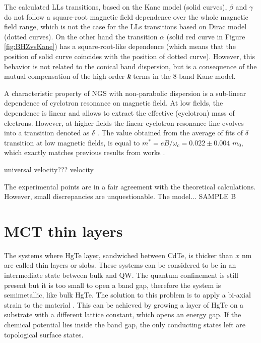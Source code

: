 \documentclass[titlepage,a4paper]{book}
\newcommand{\wciecie}{\quad\phantom{v}}
\begin{document}
The calculated LLs transitions, based on the Kane model (solid curves), $\beta$ and $\gamma$ do not follow a square-root magnetic field dependence over the whole magnetic field range, which is not the case for the LLs transitions based on Dirac model (dotted curves). On the other hand the transition $\alpha$ (solid red curve in Figure \ref{fig:BHZvsKane}) has a square-root-like dependence (which means that the position of solid curve coincides with the position of dotted curve). However, this behavior is not related to the conical band dispersion, but is a consequence of the mutual compensation of the high order \textbf{\textit{k}} terms in the 8-band Kane model.

A characteristic property of NGS with non-parabolic dispersion is a sub-linear dependence of cyclotron resonance on magnetic field. At low fields, the dependence is linear and allows to extract the effective (cyclotron) mass of electrons. However, at higher fields the linear cyclotron resonance line evolves into a transition denoted as $\delta$ \cite{Orlita_MCT_SQW}. The value obtained from the average of fits of $\delta$ transition at low magnetic fields, is equal to $m^* = eB/\omega_c = 0.022 \pm 0.004$ $m_0$, which exactly matches previous results from works \cite{Orlita_MCT_QW}\cite{Zholudev_MCT_QW}. 

universal velocity???
velocity \cite{Ludwig_MCT_QW}

The experimental points are in a fair agreement with the theoretical calculations. However, small discrepancies are unquestionable. The model...  SAMPLE B

\clearpage
\section{MCT thin layers}
\label{chpt:MCT_TL}
\wciecie
The systems where HgTe layer, sandwiched between CdTe, is thicker than $x$ nm are called thin layers or slobs. These systems can be considered to be in an intermediate state between bulk and QW. The quantum confinement is still present but it is too small to open a band gap, therefore the system is semimetallic, like bulk HgTe. The solution to this problem is to apply a bi-axial strain to the material \cite{Brune_State2}. This can be achieved by growing a layer of HgTe on a substrate with a different lattice constant, which opens an energy gap. If the chemical potential lies inside the band gap, the only conducting states left are topological surface states. 
\end{document}
